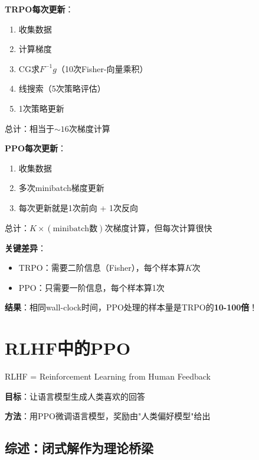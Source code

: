 \documentclass[11pt,a4paper]{article}
\theoremstyle{definition}
\begin{document}
\begin{surprising}[为什么PPO比TRPO快100倍]
\textbf{TRPO每次更新}：
\begin{enumerate}
    \item 收集数据
    \item 计算梯度
    \item CG求$F^{-1}g$（10次Fisher-向量乘积）
    \item 线搜索（5次策略评估）
    \item 1次策略更新
\end{enumerate}
总计：相当于$\sim 16$次梯度计算

\textbf{PPO每次更新}：
\begin{enumerate}
    \item 收集数据
    \item 多次minibatch梯度更新
    \item 每次更新就是1次前向 + 1次反向
\end{enumerate}
总计：$K \times (\text{minibatch数})$次梯度计算，但每次计算很快

\textbf{关键差异}：
\begin{itemize}
    \item TRPO：需要二阶信息（Fisher），每个样本算$K$次
    \item PPO：只需要一阶信息，每个样本算1次
\end{itemize}

\textbf{结果}：相同wall-clock时间，PPO处理的样本量是TRPO的\textbf{10-100倍}！
\end{surprising}

\section{RLHF中的PPO}

\begin{plainwords}[ChatGPT是怎么训练的]
RLHF = Reinforcement Learning from Human Feedback

\textbf{目标}：让语言模型生成人类喜欢的回答

\textbf{方法}：用PPO微调语言模型，奖励由"人类偏好模型"给出
\end{plainwords}

\subsection{综述：闭式解作为理论桥梁}
\end{document}
